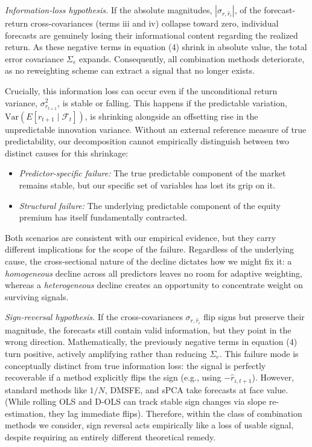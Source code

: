 \documentclass[a4paper,11pt]{article}
\begin{document}
\textit{Information-loss hypothesis.} If the absolute magnitudes, $|\sigma_{r,\hat{r}_i}|$, of the forecast-return cross-covariances (terms iii and iv) collapse toward zero, individual forecasts are genuinely losing their informational content regarding the realized return. As these negative terms in equation (4) shrink in absolute value, the total error covariance $\Sigma_e$ expands. Consequently, all combination methods deteriorate, as no reweighting scheme can extract a signal that no longer exists. 

Crucially, this information loss can occur even if the unconditional return variance, $\sigma_{r_{t+1}}^2$, is stable or falling. This happens if the predictable variation, $\mathrm{Var}(E[r_{t+1} \mid \mathcal{F}_t])$, is shrinking alongside an offsetting rise in the unpredictable innovation variance. Without an external reference measure of true predictability, our decomposition cannot empirically distinguish between two distinct causes for this shrinkage:
\begin{itemize}
    \item \textit{Predictor-specific failure:} The true predictable component of the market remains stable, but our specific set of variables has lost its grip on it.
    \item \textit{Structural failure:} The underlying predictable component of the equity premium has itself fundamentally contracted.
\end{itemize}

Both scenarios are consistent with our empirical evidence, but they carry different implications for the scope of the failure. Regardless of the underlying cause, the cross-sectional nature of the decline dictates how we might fix it: a \textit{homogeneous} decline across all predictors leaves no room for adaptive weighting, whereas a \textit{heterogeneous} decline creates an opportunity to concentrate weight on surviving signals.

\textit{Sign-reversal hypothesis.} If the cross-covariances $\sigma_{r,\hat{r}_i}$ flip signs but preserve their magnitude, the forecasts still contain valid information, but they point in the wrong direction. Mathematically, the previously negative terms in equation (4) turn positive, actively amplifying rather than reducing $\Sigma_e$. This failure mode is conceptually distinct from true information loss: the signal is perfectly recoverable if a method explicitly flips the sign (e.g., using $-\hat{r}_{i,t+1}$). However, standard methods like $1/N$, DMSFE, and sPCA take forecasts at face value. (While rolling OLS and D-OLS can track stable sign changes via slope re-estimation, they lag immediate flips). Therefore, within the class of combination methods we consider, sign reversal acts empirically like a loss of usable signal, despite requiring an entirely different theoretical remedy.
\end{document}
